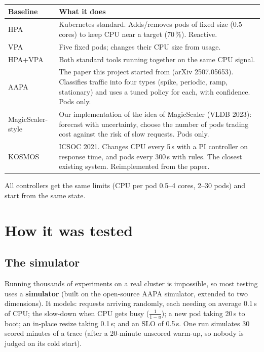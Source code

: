 \documentclass[11pt,a4paper]{article}
\begin{document}
\begin{center}
\begin{tabular}{@{}p{3.2cm}p{11.8cm}@{}}
\toprule
\textbf{Baseline} & \textbf{What it does} \\
\midrule
HPA & Kubernetes standard. Adds/removes pods of fixed size (0.5 cores) to keep CPU near a target (70\,\%). Reactive. \\
VPA & Five fixed pods; changes their CPU size from usage. \\
HPA+VPA & Both standard tools running together on the same CPU signal. \\
AAPA & The paper this project started from (arXiv 2507.05653). Classifies traffic into four types (spike, periodic, ramp, stationary) and uses a tuned policy for each, with confidence. Pods only. \\
MagicScaler-style & Our implementation of the idea of MagicScaler (VLDB 2023): forecast with uncertainty, choose the number of pods trading cost against the risk of slow requests. Pods only. \\
KOSMOS & ICSOC 2021. Changes CPU every 5\,s with a PI controller on response time, and pods every 300\,s with rules. The closest existing system. Reimplemented from the paper. \\
\bottomrule
\end{tabular}
\end{center}

All controllers get the same limits (CPU per pod 0.5--4 cores, 2--30 pods) and start from
the same state.

\section{How it was tested}

\subsection{The simulator}
Running thousands of experiments on a real cluster is impossible, so most testing uses a
\textbf{simulator} (built on the open-source AAPA simulator, extended to two dimensions).
It models: requests arriving randomly, each needing on average 0.1\,s of CPU; the
slow-down when CPU gets busy ($\frac{1}{1-u}$); a new pod taking 20\,s to boot; an
in-place resize taking 0.1\,s; and an SLO of 0.5\,s. One run simulates 30 scored minutes of
a trace (after a 20-minute unscored warm-up, so nobody is judged on its cold start).
\end{document}
